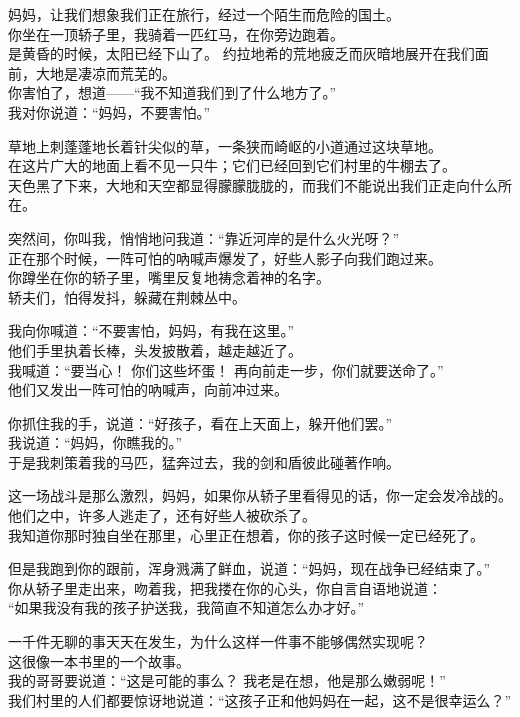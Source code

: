 \documentclass[
]{book}
\renewenvironment{quote}{\begin{VF}}{\end{VF}}
\begin{document}
\begin{quote}
妈妈，让我们想象我们正在旅行，经过一个陌生而危险的国土。\\
你坐在一顶轿子里，我骑着一匹红马，在你旁边跑着。\\
是黄昏的时候，太阳已经下山了。 约拉地希的荒地疲乏而灰暗地展开在我们面前，大地是凄凉而荒芜的。\\
你害怕了，想道------``我不知道我们到了什么地方了。''\\
我对你说道：``妈妈，不要害怕。''

草地上刺蓬蓬地长着针尖似的草，一条狭而崎岖的小道通过这块草地。\\
在这片广大的地面上看不见一只牛；它们已经回到它们村里的牛棚去了。\\
天色黑了下来，大地和天空都显得朦朦胧胧的，而我们不能说出我们正走向什么所在。

突然间，你叫我，悄悄地问我道：``靠近河岸的是什么火光呀？''\\
正在那个时候，一阵可怕的吶喊声爆发了，好些人影子向我们跑过来。\\
你蹲坐在你的轿子里，嘴里反复地祷念着神的名字。\\
轿夫们，怕得发抖，躲藏在荆棘丛中。

我向你喊道：``不要害怕，妈妈，有我在这里。''\\
他们手里执着长棒，头发披散着，越走越近了。\\
我喊道：``要当心！ 你们这些坏蛋！ 再向前走一步，你们就要送命了。''\\
他们又发出一阵可怕的吶喊声，向前冲过来。

你抓住我的手，说道：``好孩子，看在上天面上，躲开他们罢。''\\
我说道：``妈妈，你瞧我的。''\\
于是我刺策着我的马匹，猛奔过去，我的剑和盾彼此碰著作响。

这一场战斗是那么激烈，妈妈，如果你从轿子里看得见的话，你一定会发冷战的。\\
他们之中，许多人逃走了，还有好些人被砍杀了。\\
我知道你那时独自坐在那里，心里正在想着，你的孩子这时候一定已经死了。

但是我跑到你的跟前，浑身溅满了鲜血，说道：``妈妈，现在战争已经结束了。''\\
你从轿子里走出来，吻着我，把我搂在你的心头，你自言自语地说道：\\
``如果我没有我的孩子护送我，我简直不知道怎么办才好。''

一千件无聊的事天天在发生，为什么这样一件事不能够偶然实现呢？\\
这很像一本书里的一个故事。\\
我的哥哥要说道：``这是可能的事么？ 我老是在想，他是那么嫩弱呢！''\\
我们村里的人们都要惊讶地说道：``这孩子正和他妈妈在一起，这不是很幸运么？''
\end{quote}
\end{document}
